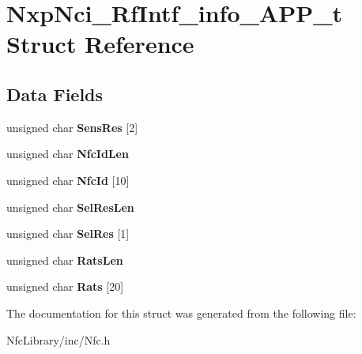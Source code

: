 \hypertarget{struct_nxp_nci___rf_intf__info___a_p_p__t}{}\section{Nxp\+Nci\+\_\+\+Rf\+Intf\+\_\+info\+\_\+\+A\+P\+P\+\_\+t Struct Reference}
\label{struct_nxp_nci___rf_intf__info___a_p_p__t}
\subsection*{Data Fields}
\begin{DoxyCompactItemize}
\item 
\mbox{\label{struct_nxp_nci___rf_intf__info___a_p_p__t_a78224523661df80bc72f96bd37f54bd2}} 
unsigned char {\bfseries Sens\+Res} \mbox{[}2\mbox{]}
\item 
\mbox{\label{struct_nxp_nci___rf_intf__info___a_p_p__t_aa0c58e35fb67d6cf5fdd468b6358b239}} 
unsigned char {\bfseries Nfc\+Id\+Len}
\item 
\mbox{\label{struct_nxp_nci___rf_intf__info___a_p_p__t_a22744a8061a0a69526356ab3e55d893a}} 
unsigned char {\bfseries Nfc\+Id} \mbox{[}10\mbox{]}
\item 
\mbox{\label{struct_nxp_nci___rf_intf__info___a_p_p__t_a6b04ea547e65bbf7e7ff75a3432fac74}} 
unsigned char {\bfseries Sel\+Res\+Len}
\item 
\mbox{\label{struct_nxp_nci___rf_intf__info___a_p_p__t_afc8317bb3f7da2d9fc3d368e2015e131}} 
unsigned char {\bfseries Sel\+Res} \mbox{[}1\mbox{]}
\item 
\mbox{\label{struct_nxp_nci___rf_intf__info___a_p_p__t_ad669e4e2f77b5e5b55895982d238bae8}} 
unsigned char {\bfseries Rats\+Len}
\item 
\mbox{\label{struct_nxp_nci___rf_intf__info___a_p_p__t_aed9f3f7726668e5e0c8f415d8837da68}} 
unsigned char {\bfseries Rats} \mbox{[}20\mbox{]}
\end{DoxyCompactItemize}


The documentation for this struct was generated from the following file\+:\begin{DoxyCompactItemize}
\item 
Nfc\+Library/inc/Nfc.\+h\end{DoxyCompactItemize}
